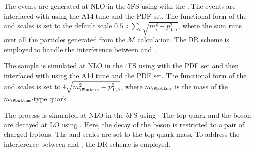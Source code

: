 
The \tHW events are generated at NLO in the 5FS using \MGNLO[2.8.1]
with the \NNPDF[3.0nlo]. The events are interfaced with
\PYTHIA[8.245p3] using the A14 tune and the \NNPDF[2.3lo] PDF set.
The functional form of the \muR and \muF scales is set to the
default scale \(0.5\times \sum_i \sqrt{m^2_i+p^2_{\text{T},i}}\), where the sum runs over
all the particles generated from the $\mathcal{M}$ calculation.
The DR scheme is employed to handle the interference
between \tHW{} and \ttH.


The \tZq sample is simulated at NLO in the 4FS
using \MGNLO[2.3.3] with the \NNPDF[3.0nlo] PDF set
and then interfaced with \PYTHIA[8.230] using the A14 tune
and the \NNPDF[2.3lo] PDF set.
The functional form of the \muR and \muF scales
is set to $4\sqrt{m_{\Pbottom}^2+ p^{2}_{\text{T},b}}$, where $m_{\Pbottom}$ is the mass of
the $m_{\Pbottom}$-type quark~\cite{Frederix:2012dh}.

The \tWZ process is simulated at NLO in the 5FS using \MGNLO[2.3.3]. %
The top quark and the \PZ boson are decayed at LO using \MADSPIN. Here, the decay 
of the \PZ boson is restricted to a pair of charged leptons.
The \muR and \muF scales are set to the top-quark mass.
To address the  interference between \tWZ and \ttZ, the DR scheme is employed.

